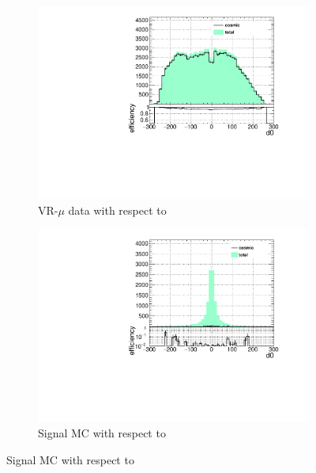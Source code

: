 \begin{figure}[h]
  \begin{subfigure}[b]{0.4\textwidth}
  	\includegraphics[width=\textwidth]{figures/cosmics/wider_tag_ratio_d0.pdf}
  	\caption{VR-$\mu$ data with respect to \dz}
  \end{subfigure}
  \begin{subfigure}[b]{0.4\textwidth}
  	\includegraphics[width=\textwidth]{figures/cosmics/mc_300_ratio_d0.pdf}
  	\caption{Signal \ac{MC} with respect to \dz}
  \end{subfigure}


\end{figure}
